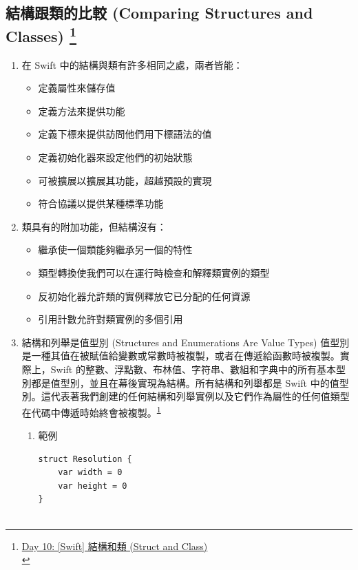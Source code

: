 \documentclass[a4paper,12pt]{article}
\begin{document}
\subsection{結構跟類的比較 (Comparing Structures and Classes) \footnote{\href{https://ithelp.ithome.com.tw/articles/10220520}{ Day 10: [Swift] 結構和類 (Struct and Class) }\\\label{org3a9738d}}}
\label{sec:org7ddd4a7}
\begin{enumerate}
\item 在 Swift 中的結構與類有許多相同之處，兩者皆能：
\label{sec:orgcb30043}
\begin{itemize}
\item 定義屬性來儲存值\\
\item 定義方法來提供功能\\
\item 定義下標來提供訪問他們用下標語法的值\\
\item 定義初始化器來設定他們的初始狀態\\
\item 可被擴展以擴展其功能，超越預設的實現\\
\item 符合協議以提供某種標準功能\\
\end{itemize}
\item 類具有的附加功能，但結構沒有：
\label{sec:org65cc083}
\begin{itemize}
\item 繼承使一個類能夠繼承另一個的特性\\
\item 類型轉換使我們可以在運行時檢查和解釋類實例的類型\\
\item 反初始化器允許類的實例釋放它已分配的任何資源\\
\item 引用計數允許對類實例的多個引用\\
\end{itemize}
\item 結構和列舉是值型別 (Structures and Enumerations Are Value Types)
\label{sec:org5f98dca}
值型別是一種其值在被賦值給變數或常數時被複製，或者在傳遞給函數時被複製。實際上，Swift 的整數、浮點數、布林值、字符串、數組和字典中的所有基本型別都是值型別，並且在幕後實現為結構。所有結構和列舉都是 Swift 中的值型別。這代表著我們創建的任何結構和列舉實例以及它們作為屬性的任何值類型在代碼中傳遞時始終會被複製。\textsuperscript{\ref{org3a9738d}}\\
\begin{enumerate}
\item 範例
\label{sec:org574b3e1}
\lstset{breaklines=true,language=swift,label= ,caption= ,captionpos=b,firstnumber=1,numbers=left}
\begin{lstlisting}
struct Resolution {
    var width = 0
    var height = 0
}


\end{lstlisting}
\end{enumerate}
\end{enumerate}
\end{document}
